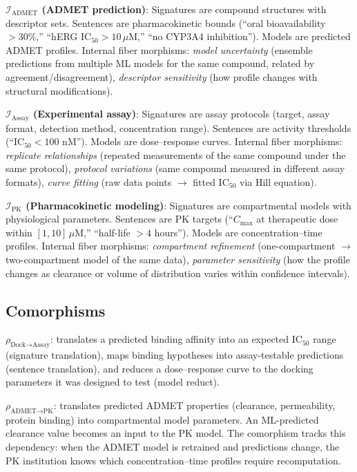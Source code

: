 \documentclass[10pt,twocolumn,letterpaper]{article}
\begin{document}
\textbf{$\mathcal{I}_{\text{ADMET}}$ (ADMET prediction)}: Signatures are compound structures with descriptor sets. Sentences are pharmacokinetic bounds (``oral bioavailability $> 30\%$,'' ``hERG IC$_{50} > 10\,\mu$M,'' ``no CYP3A4 inhibition''). Models are predicted ADMET profiles. Internal fiber morphisms: \emph{model uncertainty} (ensemble predictions from multiple ML models for the same compound, related by agreement/disagreement), \emph{descriptor sensitivity} (how profile changes with structural modifications).

\textbf{$\mathcal{I}_{\text{Assay}}$ (Experimental assay)}: Signatures are assay protocols (target, assay format, detection method, concentration range). Sentences are activity thresholds (``IC$_{50} < 100$ nM''). Models are dose--response curves. Internal fiber morphisms: \emph{replicate relationships} (repeated measurements of the same compound under the same protocol), \emph{protocol variations} (same compound measured in different assay formats), \emph{curve fitting} (raw data points $\to$ fitted IC$_{50}$ via Hill equation).

\textbf{$\mathcal{I}_{\text{PK}}$ (Pharmacokinetic modeling)}: Signatures are compartmental models with physiological parameters. Sentences are PK targets (``$C_{\max}$ at therapeutic dose within $[1, 10]\,\mu$M,'' ``half-life $> 4$ hours''). Models are concentration--time profiles. Internal fiber morphisms: \emph{compartment refinement} (one-compartment $\to$ two-compartment model of the same data), \emph{parameter sensitivity} (how the profile changes as clearance or volume of distribution varies within confidence intervals).

\subsection{Comorphisms}

$\rho_{\text{Dock} \to \text{Assay}}$: translates a predicted binding affinity into an expected IC$_{50}$ range (signature translation), maps binding hypotheses into assay-testable predictions (sentence translation), and reduces a dose--response curve to the docking parameters it was designed to test (model reduct).

$\rho_{\text{ADMET} \to \text{PK}}$: translates predicted ADMET properties (clearance, permeability, protein binding) into compartmental model parameters. An ML-predicted clearance value becomes an input to the PK model. The comorphism tracks this dependency: when the ADMET model is retrained and predictions change, the PK institution knows which concentration--time profiles require recomputation.
\end{document}
